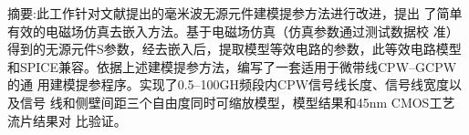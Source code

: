 \noindent%
{\heiti 摘要:}此工作针对文献\cite{brinkhoff2008scalable}提出的毫米波无源元件建模提参方法进行改进，提出
了简单有效的电磁场仿真去嵌入方法。基于电磁场仿真（仿真参数通过测试数据校
准）得到的无源元件S参数，经去嵌入后，提取模型等效电路的参数，此等效电路模型
和SPICE兼容。依据上述建模提参方法，编写了一套适用于微带线CPW--GCPW的通
用建模提参程序。实现了0.5--100GH频段内CPW信号线长度、信号线宽度以及信号 
线和侧壁间距三个自由度同时可缩放模型，模型结果和45nm CMOS工艺流片结果对
比验证。
\indent

